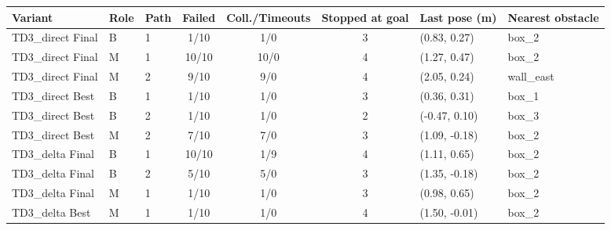 \begin{tabular}{lllcccll}
\midrule[1.5pt]
\textbf{Variant} & \textbf{Role} & \textbf{Path} & \textbf{Failed} & \textbf{Coll./Timeouts} & \textbf{Stopped at goal} & \textbf{Last pose (m)} & \textbf{Nearest obstacle} \\
\midrule[1.5pt]
TD3\_direct Final & B & 1 & 1/10 & 1/0 & 3 & (0.83, 0.27) & box\_2 \\
TD3\_direct Final & M & 1 & 10/10 & 10/0 & 4 & (1.27, 0.47) & box\_2 \\
TD3\_direct Final & M & 2 & 9/10 & 9/0 & 4 & (2.05, 0.24) & wall\_east \\
\midrule
TD3\_direct Best & B & 1 & 1/10 & 1/0 & 3 & (0.36, 0.31) & box\_1 \\
TD3\_direct Best & B & 2 & 1/10 & 1/0 & 2 & (-0.47, 0.10) & box\_3 \\
TD3\_direct Best & M & 2 & 7/10 & 7/0 & 3 & (1.09, -0.18) & box\_2 \\
\midrule
TD3\_delta Final & B & 1 & 10/10 & 1/9 & 4 & (1.11, 0.65) & box\_2 \\
TD3\_delta Final & B & 2 & 5/10 & 5/0 & 3 & (1.35, -0.18) & box\_2 \\
TD3\_delta Final & M & 1 & 1/10 & 1/0 & 3 & (0.98, 0.65) & box\_2 \\
\midrule
TD3\_delta Best & M & 1 & 1/10 & 1/0 & 4 & (1.50, -0.01) & box\_2 \\
\midrule[1.5pt]
\end{tabular}
